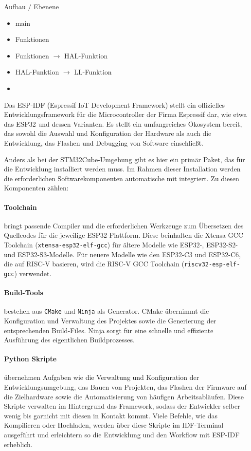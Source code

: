 Aufbau / Ebenene
\begin{itemize}
	\item main
	\item Funktionen
	\item Funktionen $\rightarrow$ HAL-Funktion
	\item HAL-Funktion $\rightarrow$ LL-Funktion
	\item 
\end{itemize}

Das ESP-IDF (Espressif IoT Development Framework) stellt ein offizielles Entwicklungsframework für die Microcontroller der Firma Espressif dar, wie etwa das ESP32 und dessen Varianten. 
Es stellt ein umfangreiches Ökosystem bereit, das sowohl die Auswahl und Konfiguration der Hardware als auch die Entwicklung, das Flashen und Debugging von Software einschließt.

Anders als bei der STM32Cube-Umgebung gibt es hier ein primär Paket, das für die Entwicklung installiert werden muss.
Im Rahmen dieser Installation werden die erforderlichen Softwarekomponenten automatische mit integriert.
Zu diesen Komponenten zählen:

\paragraph{Toolchain}
bringt passende Compiler und die erforderlichen Werkzeuge zum Übersetzen des Quellcodes für die jeweilige ESP32-Plattform. 
Diese beinhalten die Xtensa GCC Toolchain (\texttt{xtensa-esp32-elf-gcc}) für ältere Modelle wie  ESP32-, ESP32-S2- und ESP32-S3-Modelle.
Für neuere Modelle wie den ESP32-C3 und ESP32-C6, die auf RISC-V basieren, wird die RISC-V GCC Toolchain (\texttt{riscv32-esp-elf-gcc}) verwendet.

\paragraph{Build-Tools} 
bestehen aus \texttt{CMake} und \texttt{Ninja} als Generator. 
CMake übernimmt die Konfiguration und Verwaltung des Projektes sowie die Generierung der entsprechenden Build-Files. 
Ninja sorgt für eine schnelle und effiziente Ausführung des eigentlichen Buildprozesses.

\paragraph{Python Skripte}
übernehmen Aufgaben wie die Verwaltung und Konfiguration der Entwicklungsumgebung, das Bauen von Projekten, das Flashen der Firmware auf die Zielhardware sowie die Automatisierung von häufigen Arbeitsabläufen. 
Diese Skripte verwalten im Hintergrund das Framework, sodass der Entwickler selber wenig bis garnicht mit diesen in Kontakt kommt.
Viele Befehle, wie das Kompilieren oder Hochladen, werden über diese Skripte im IDF-Terminal ausgeführt und erleichtern so die Entwicklung und den Workflow mit ESP-IDF erheblich.

